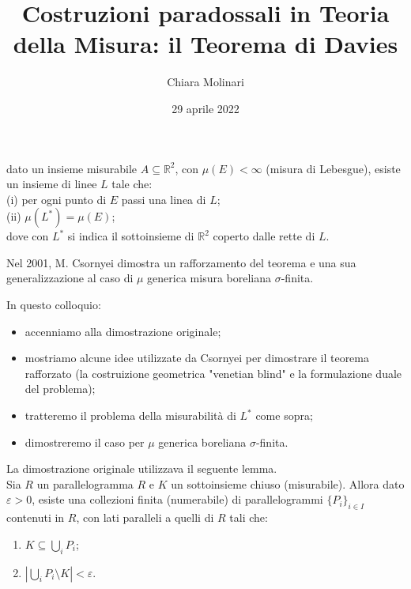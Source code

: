 \documentclass[11pt]{beamer} %
\author{Chiara Molinari}
\title{Costruzioni paradossali in Teoria della Misura: il Teorema di Davies}
\date{29 aprile 2022}
\newcommand{\R}{\mathbb{R}}
\newcommand{\<}{\langle}
\renewcommand{\>}{\rangle}
\theoremstyle{theorem}
\theoremstyle{theorem}
\theoremstyle{theorem}
\theoremstyle{theorem}
\theoremstyle{theorem}
\begin{document}

\begin{frame}
	\maketitle
\end{frame}


\begin{frame}[fragile]
	 dato un insieme misurabile $A \subseteq \R^2$, con $\mu(E)< \infty$ (misura di Lebesgue), esiste un insieme di linee $L$ tale che:\\
	(i) per ogni punto di $E$ passi una linea di $L$;\\
	(ii) $\mu(L^*)=\mu(E)$;\\
	dove con $L^*$ si indica il sottoinsieme di $\R^2$ coperto dalle rette di $L$.
	
	\medskip
	
	Nel 2001, M. Csornyei dimostra un rafforzamento del teorema e una sua generalizzazione al caso di $\mu$ generica misura boreliana $\sigma$-finita. 
	
	\medskip
	 
	In questo colloquio:\\
	\begin{itemize}
		\item accenniamo alla dimostrazione originale;\\
		\item mostriamo alcune idee utilizzate da Csornyei per dimostrare il teorema rafforzato (la costruizione geometrica "venetian blind" e la formulazione duale del problema);\\
		\item tratteremo il problema della misurabilità di $L^*$ come sopra;\\
		\item dimostreremo il caso per $\mu$ generica boreliana $\sigma$-finita.
	\end{itemize}

\end{frame}
	
\begin{frame}
	
	
	La dimostrazione originale utilizzava il seguente lemma.\\
	
	Sia $R$ un parallelogramma $R$ e $K$ un sottoinsieme chiuso (misurabile). Allora dato $\varepsilon>0$, esiste una collezioni finita (numerabile) di parallelogrammi $\{P_i\}_{i \in I}$ contenuti in $R$, con lati paralleli a quelli di $R$ tali che:\\
	\begin{enumerate}[i]
		\item $K \subseteq \bigcup_i P_i$;	
		\item $|\bigcup_i P_i \setminus K|< \varepsilon$.
	\end{enumerate}
	

\end{frame}
\end{document}
